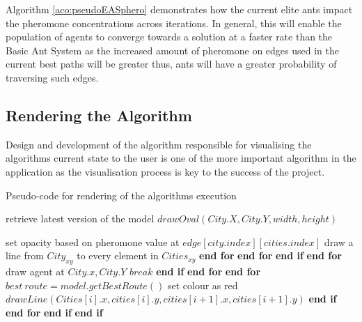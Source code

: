 Algorithm \ref{aco:pseudoEASphero} demonstrates how the current elite ants impact the pheromone concentrations across iterations. In general, this will enable the population of agents to converge towards a solution at a faster rate than the Basic Ant System as the increased amount of pheromone on edges used in the current best paths will be greater thus, ants will have a greater probability of traversing such edges.

\subsection{Rendering the Algorithm}

Design and development of the algorithm responsible for visualising the algorithms current state to the user is one of the more important algorithm in the application as the visualisation process is key to the success of the project.

\begin{algorithm}[H]
\caption{Pseudo-code for rendering of the algorithms execution}
\label{aco:renderPesudo}
\begin{algorithmic}[1]

\State retrieve latest version of the model
\State $drawOval(City.X, City.Y, width, height)$

\State set opacity based on pheromone value at $edge[city.index][cities.index]$
\State draw a line from $City_{xy}$ to every element in $Cities_{xy}$
\EndFor 
\State \textbf{end for}
\EndFor 
\State \textbf{end for}
\EndIf
\State \textbf{end if}
\EndFor
\State \textbf{end for}
\State draw agent at $City.x, City.Y$
\State $break$
\EndIf
\State \textbf{end if}
\EndFor
\State \textbf{end for}
\EndFor
\State \textbf{end for}
\State $best\ route = model.getBestRoute()$
\State set colour as red
\State $drawLine(Cities[i].x, cities[i].y, cities[i + 1].x, cities[i + 1].y)$
\EndIf
\State \textbf{end if}
\EndFor
\State \textbf{end for}
\EndIf
\State \textbf{end if}
\EndIf
\State \textbf{end if}

\end{algorithmic}
\end{algorithm}

